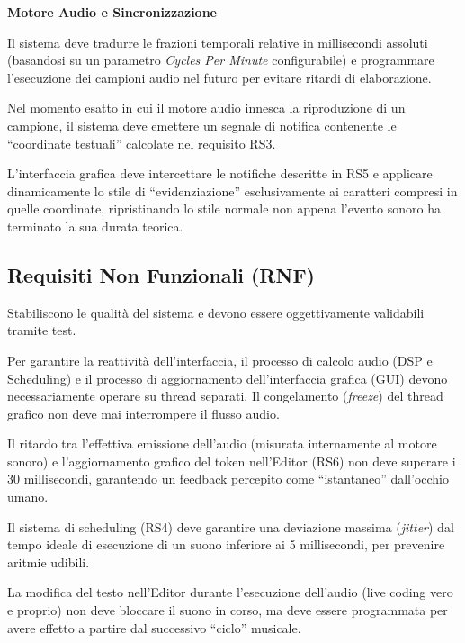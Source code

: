 \vspace{0.5cm}
\noindent\textbf{Motore Audio e Sincronizzazione}
\begin{description}[leftmargin=0.5cm, itemsep=0.8em]
    \item[RS4 (Scheduling degli Eventi):] Il sistema deve tradurre le frazioni temporali relative in millisecondi assoluti (basandosi su un parametro \emph{Cycles Per Minute} configurabile) e programmare l'esecuzione dei campioni audio nel futuro per evitare ritardi di elaborazione.

    \item[RS5 (Notifica di Avvenuta Esecuzione):] Nel momento esatto in cui il motore audio innesca la riproduzione di un campione, il sistema deve emettere un segnale di notifica contenente le ``coordinate testuali'' calcolate nel requisito RS3.

    \item[RS6 (Aggiornamento della UI):] L'interfaccia grafica deve intercettare le notifiche descritte in RS5 e applicare dinamicamente lo stile di ``evidenziazione'' esclusivamente ai caratteri compresi in quelle coordinate, ripristinando lo stile normale non appena l'evento sonoro ha terminato la sua durata teorica.
\end{description}

\subsection{Requisiti Non Funzionali (RNF)}
Stabiliscono le qualità del sistema e devono essere oggettivamente validabili tramite test.

\begin{description}[leftmargin=0.5cm, itemsep=0.8em]
    \item[RNF1 (Architettura Multi-Thread):] Per garantire la reattività dell'interfaccia, il processo di calcolo audio (DSP e Scheduling) e il processo di aggiornamento dell'interfaccia grafica (GUI) devono necessariamente operare su thread separati. Il congelamento (\emph{freeze}) del thread grafico non deve mai interrompere il flusso audio.

    \item[RNF2 (Latenza Visiva):] Il ritardo tra l'effettiva emissione dell'audio (misurata internamente al motore sonoro) e l'aggiornamento grafico del token nell'Editor (RS6) non deve superare i 30 millisecondi, garantendo un feedback percepito come ``istantaneo'' dall'occhio umano.

    \item[RNF3 (Jitter Audio):] Il sistema di scheduling (RS4) deve garantire una deviazione massima (\emph{jitter}) dal tempo ideale di esecuzione di un suono inferiore ai 5 millisecondi, per prevenire aritmie udibili.

    \item[RNF4 (Tolleranza ai Cambiamenti):] La modifica del testo nell'Editor durante l'esecuzione dell'audio (live coding vero e proprio) non deve bloccare il suono in corso, ma deve essere programmata per avere effetto a partire dal successivo ``ciclo'' musicale.
\end{description}

